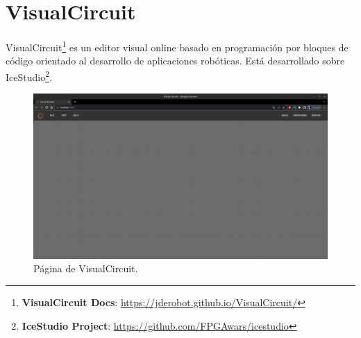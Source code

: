 \section{VisualCircuit}
\label{sec:visualcircuit}

VisualCircuit\footnote{\textbf{VisualCircuit Docs}: \url{https://jderobot.github.io/VisualCircuit/}} es un editor visual online basado en
programación por bloques de código orientado al desarrollo de aplicaciones robóticas. Está desarrollado sobre
IceStudio\footnote{\textbf{IceStudio Project}: \url{https://github.com/FPGAwars/icestudio}}.\\

\begin{figure} [H]
    \begin{center}
        \includegraphics[width=13cm]{figs/c3/empty_VC.png}
    \end{center}
    \caption[VisualCircuit]{Página de VisualCircuit.}
    \label{fig:VC_empty}
\end{figure}

